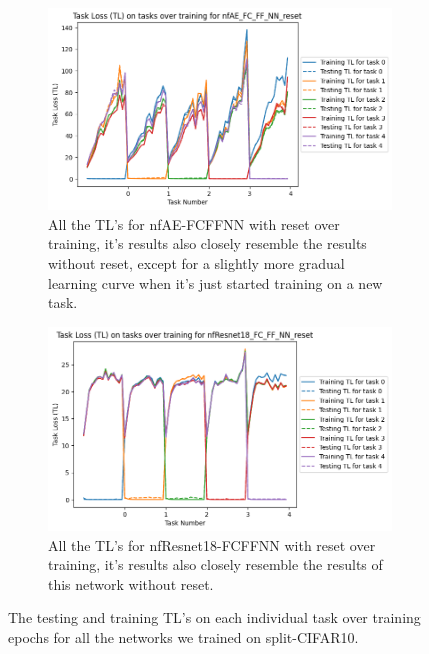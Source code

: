 \begin{appendices}
\begin{figure}[ht]
   \begin{subfigure}[t]{0.4\textwidth}
      \includegraphics[width=\linewidth]{images/CIFAR10_CL/nfAE_FC_FF_NN_reset_TL_task.png}
      \caption{All the TL's for nfAE-FCFFNN with reset over training, it's results also closely resemble the results without reset, except for a slightly more gradual learning curve when it's just started training on a new task.}
   \end{subfigure}
   \quad
    \begin{subfigure}[t]{0.4\textwidth}
      \includegraphics[width=\linewidth]{images/CIFAR10_CL/nfResnet18_FC_FF_NN_reset_TL_task.png}
      \caption{All the TL's for nfResnet18-FCFFNN with reset over training, it's results also closely resemble the results of this network without reset.}
   \end{subfigure}
    
    \caption{The testing and training TL's on each individual task over training epochs for all the networks we trained on split-CIFAR10.}
    \label{fig:CIFAR10-CL-TL-reset}
\end{figure}


\end{appendices}

